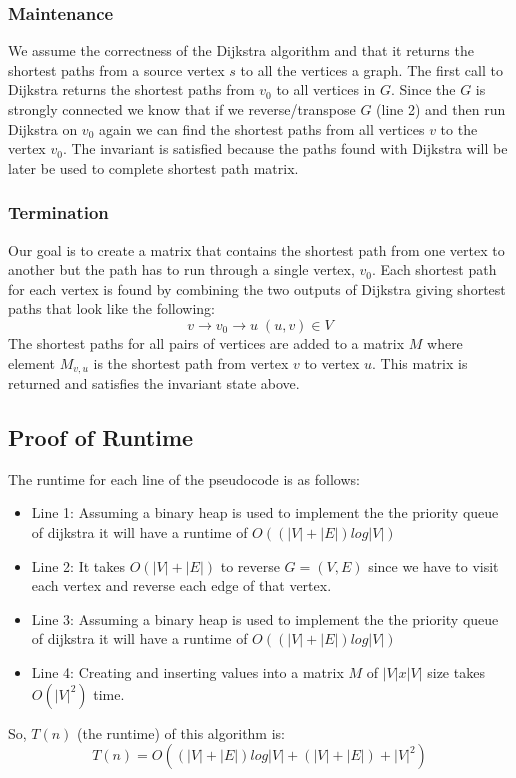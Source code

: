 \documentclass[12pt]{article}
\begin{document}
\subsubsection*{Maintenance}
We assume the correctness of the Dijkstra algorithm and that it returns the shortest paths from a source vertex $s$ to all the vertices a graph.  The first call to Dijkstra returns the shortest paths from $v_0$ to all vertices
in $G$.  Since the $G$ is strongly connected we know that if we reverse/transpose $G$ (line 2) and then run Dijkstra on $v_0$ again we can find the shortest paths from all vertices $v$ to the vertex $v_0$.  The invariant is satisfied because the paths found with Dijkstra will be later be used to complete shortest path matrix.\\
\subsubsection*{Termination}
Our goal is to create a matrix that contains the shortest path from one vertex to another but the path has to run through a single vertex, $v_0$.  Each shortest path for each vertex is found by combining the two outputs of Dijkstra giving shortest paths that look like the following:
$$
v \rightarrow v_0 \rightarrow u\;(u,v) \in V
$$
The shortest paths for all pairs of vertices are added to a matrix $M$ where element $M_{v,u}$ is the shortest path from vertex $v$ to vertex $u$.  This matrix is returned and satisfies the invariant state above.
\subsection*{Proof of Runtime}
The runtime for each line of the pseudocode is as follows:
\begin{itemize}
\item Line 1: Assuming a binary heap is used to implement the the priority queue of dijkstra it will have a runtime of $O((|V|+|E|)log|V|)$
\item Line 2: It takes $O(|V|+|E|)$ to reverse $G=(V,E)$ since we have to visit each vertex and reverse each edge of that vertex.
\item Line 3: Assuming a binary heap is used to implement the the priority queue of dijkstra it will have a runtime of $O((|V|+|E|)log|V|)$
\item Line 4: Creating and inserting values into a matrix $M$ of $|V|x|V|$ size takes $O(|V|^2)$ time.
\end{itemize}
So, $T(n)$ (the runtime) of this algorithm is:
$$
T(n) = O((|V|+|E|)log|V| + (|V|+|E|) + |V|^2)
$$
\end{document}
